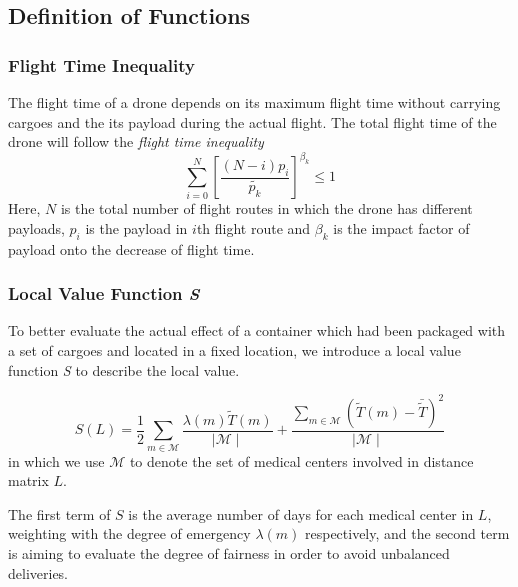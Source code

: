 \documentclass[12pt]{article}
\begin{document}
		\subsection{Definition of Functions}
		
			\subsubsection{Flight Time Inequality}	
			The flight time of a drone depends on its maximum flight time without carrying cargoes and the its payload during the actual flight. The total flight time of the drone will follow the \textit{flight time inequality}
			\begin{equation}
			\sum_{i=0}^{N}[\frac{(N-i)p_i}{\tilde{p_k}}]^{\beta_k} \leq 1
			\end{equation}	
			Here, $N$ is the total number of flight routes in which the drone has different payloads, $p_i$ is the payload in $i$th flight route and $\beta_k$ is the impact factor of payload onto the decrease of flight time.
			
			\subsubsection{Local Value Function \textit{S}}
			To better evaluate the actual effect of a container which had been packaged with a set of cargoes and located in a fixed location, we introduce a local value function \textit{S} to describe the local value. \par 
			\begin{equation}
				S(L) = \frac{1}{2}\sum_{m \in \mathcal{M}}\frac{\lambda(m)\tilde{T}(m)}{{\mid}\mathcal{M}{\mid}} + \frac{\sum_{m\in\mathcal{M}}(\tilde{T}(m)-\bar{\tilde{T}})^2}{{\mid}\mathcal{M}{\mid}}
			\end{equation}
			in which we use $\mathcal{M}$ to denote the set of medical centers involved in distance matrix $L$.  \par 
			The first term of $S$ is the average number of days for each medical center in $L$, weighting with the degree of emergency $\lambda(m)$ respectively, and the second term is aiming to evaluate the degree of fairness in order to avoid unbalanced deliveries. 
			
\end{document}
